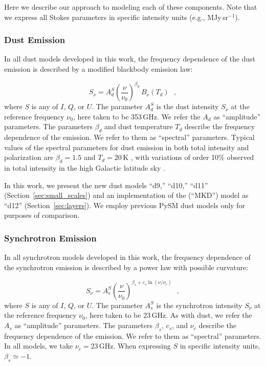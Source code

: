 \documentclass[twocolumn]{aastex631}
\begin{document}
Here we describe our approach to modeling each of these components. Note that we express all Stokes parameters in specific intensity units (e.g., MJy\,sr$^{-1}$).

\subsubsection{Dust Emission} \label{subsubsec:dust_model}
In all dust models developed in this work, the frequency dependence of the dust emission is described by a modified blackbody emission law:

\begin{equation} \label{eq:dust-emission-law}
    S_\nu = A_d^S \left(\frac{\nu}{\nu_0}\right)^{\beta_d} \, B_\nu(T_d)
    ~~~,
\end{equation}
where $S$ is any of $I$, $Q$, or $U$. The parameter $A_d^S$ is the dust intensity $S_\nu$ at the reference frequency $\nu_0$, here taken to be 353\,GHz. We refer the $A_d$ as ``amplitude'' parameters. The parameters $\beta_d$ and dust temperature $T_d$ describe the frequency dependence of the emission. We refer to them as ``spectral'' parameters. Typical values of the spectral parameters for dust emission in both total intensity and polarization are $\beta_d = 1.5$ and $T_d = 20$\,K \citep{planck2016-l11A}, with variations of order 10\% observed in total intensity in the high Galactic latitude sky \citep[e.g.,][]{planck2014-a12, planck2016-XLVIII}.

In this work, we present the new dust models ``d9,'' ``d10,'' ``d11'' (Section~\ref{sec:small_scales}) and an implementation of the \citet{Martinez-Solaeche:2018} (``MKD'') model as ``d12'' (Section~\ref{sec:layers}). We employ previous PySM dust models only for purposes of comparison.

\subsubsection{Synchrotron Emission} \label{subsubsec:synch_model}
In all synchrotron models developed in this work, the frequency dependence of the synchrotron emission is described by a power law with possible curvature:

\begin{equation}
    S_\nu = A_s^S \left(\frac{\nu}{\nu_0}\right)^{\beta_s + c_s \ln\left(\nu/\nu_c\right)}
    ~~~,
\end{equation}
where $S$ is any of $I$, $Q$, or $U$. The parameter $A_s^S$ is the synchrotron intensity $S_\nu$ at the reference frequency $\nu_0$, here taken to be 23\,GHz. As with dust, we refer the $A_s$ as ``amplitude'' parameters. The parameters $\beta_s$, $c_s$, and $\nu_c$ describe the frequency dependence of the emission. We refer to them as ``spectral'' parameters. In all models, we take $\nu_c = 23$\,GHz. When expressing $S$ in specific intensity units, $\beta_s \simeq -1$.
\end{document}
